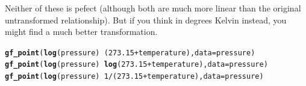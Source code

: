 \documentclass[twoside]{book}\usepackage[]{graphicx}\usepackage[]{xcolor}
\makeatletter
\newcommand{\hlnum}[1]{\textcolor[rgb]{0.686,0.059,0.569}{#1}}%
\newcommand{\hlopt}[1]{\textcolor[rgb]{0,0,0}{#1}}%
\newcommand{\hlstd}[1]{\textcolor[rgb]{0.345,0.345,0.345}{#1}}%
\newcommand{\hlkwc}[1]{\textcolor[rgb]{0.333,0.667,0.333}{#1}}%
\newcommand{\hlkwd}[1]{\textcolor[rgb]{0.737,0.353,0.396}{\textbf{#1}}}%
\newenvironment{kframe}{%
 \def\at@end@of@kframe{}%
 \ifinner\ifhmode%
  \def\at@end@of@kframe{\end{minipage}}%
  \begin{minipage}{\columnwidth}%
 \fi\fi%
 \def\FrameCommand##1{\hskip\@totalleftmargin \hskip-\fboxsep
 \colorbox{shadecolor}{##1}\hskip-\fboxsep
     \hskip-\linewidth \hskip-\@totalleftmargin \hskip\columnwidth}%
 \MakeFramed {\advance\hsize-\width
   \@totalleftmargin\z@ \linewidth\hsize
   \@setminipage}}%
 {\par\unskip\endMakeFramed%
 \at@end@of@kframe}
\newenvironment{knitrout}{}{} %
\makeatother
\begin{document}
\begin{solution}
\begin{knitrout}
\end{knitrout}

Neither of these is pefect (although both are much more linear than the original untransformed relationship).
But if you think in degrees Kelvin instead, you might find a much better transformation.
\begin{knitrout}
\color{fgcolor}\begin{kframe}
\begin{alltt}
\hlkwd{gf_point}\hlstd{(}\hlkwd{log}\hlstd{(pressure)} \hlopt{~} \hlstd{(}\hlnum{273.15} \hlopt{+} \hlstd{temperature),} \hlkwc{data} \hlstd{= pressure)}
\hlkwd{gf_point}\hlstd{(}\hlkwd{log}\hlstd{(pressure)} \hlopt{~} \hlkwd{log}\hlstd{(}\hlnum{273.15} \hlopt{+} \hlstd{temperature),} \hlkwc{data} \hlstd{= pressure)}
\hlkwd{gf_point}\hlstd{(}\hlkwd{log}\hlstd{(pressure)} \hlopt{~} \hlnum{1}\hlopt{/}\hlstd{(}\hlnum{273.15} \hlopt{+} \hlstd{temperature),} \hlkwc{data} \hlstd{= pressure)}
\end{alltt}
\end{kframe}


\end{knitrout}
\end{solution}
\end{document}
